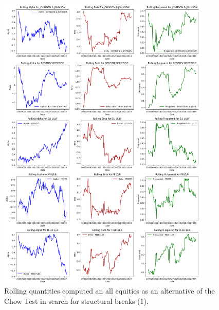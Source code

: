 \documentclass[12pt, openright, twoside]{report}
\begin{document}
\begin{figure}[h!]
    \centering
    \includegraphics[width=0.9\textwidth]{images/rolling_quantities_1.png}
    \caption{Rolling quantities computed an all equities as an alternative of the Chow Test in search for structural
    breaks (1).}\label{fig:rolling_quantities_1}
\end{figure}
\end{document}
